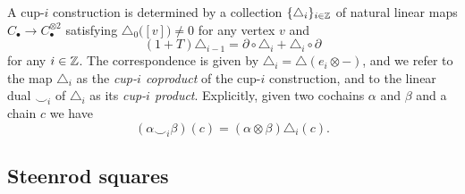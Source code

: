 A cup-$i$ construction is determined by a collection $\{\triangle_i\}_{i \in \mathbb{Z}}$ of natural linear maps $C_\bullet \to C_\bullet^{\otimes 2}$ satisfying $\triangle_0 \big([v]\big) \neq 0$ for any vertex $v$ and
\begin{equation} \label{e:boundary of cup-i}
(1 + T) \triangle_{i-1} = \partial \circ \triangle_i + \triangle_i \circ \partial
\end{equation}
for any $i \in \mathbb{Z}$.
The correspondence is given by $\triangle_i = \triangle(e_i \otimes -)$, and we refer to the map $\triangle_i$ as the \textit{cup-$i$ coproduct} of the cup-$i$ construction, and to the linear dual $\smallsmile_i$ of $\triangle_i$ as its \textit{cup-$i$ product}.
Explicitly, given two cochains $\alpha$ and $\beta$ and a chain $c$ we have
\begin{equation*}
(\alpha \smallsmile_i \beta)(c) = (\alpha \otimes \beta) \triangle_i(c).
\end{equation*}

\subsection{Steenrod squares}

